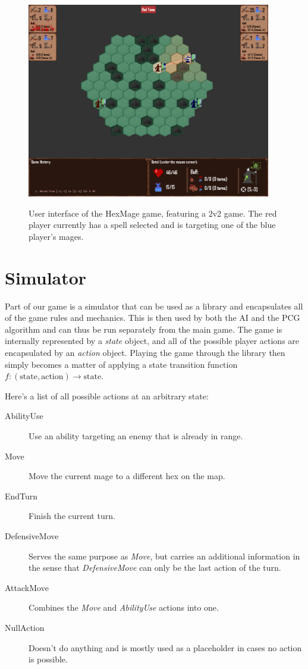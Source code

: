 \begin{figure}[h]
	\centering
	\includegraphics[width=0.95\textwidth]{img/arena.png}\label{fig:arena}
	\caption{User interface of the HexMage game, featuring a 2v2 game. The red player currently has a spell selected and is targeting one of the blue player's mages.}
\end{figure}


\section{Simulator}

Part of our game is a simulator that can be used as a library and encapsulates
all of the game rules and mechanics. This is then used by both the AI and the
PCG algorithm and can thus be run separately from the main game. The game is
internally represented by a \emph{state} object, and all of the possible player
actions are encapsulated by an \emph{action} object.  Playing the game through
the library then simply becomes a matter of applying a state transition
function $f: (\text{state}, \text{action}) \rightarrow \text{state}$.

Here's a list of all possible actions at an arbitrary state:

\begin{description}
\item [AbilityUse] Use an ability targeting an enemy that is already in range.
\item [Move] Move the current mage to a different hex on the map.
\item [EndTurn] Finish the current turn.
\item [DefensiveMove] Serves the same purpose as \emph{Move}, but carries an
additional information in the sense that \emph{DefensiveMove} can only be
the last action of the turn.
\item [AttackMove] Combines the \emph{Move} and \emph{AbilityUse} actions into one.
\item [NullAction] Doesn't do anything and is mostly used as a placeholder in cases no action is possible.
\end{description}

